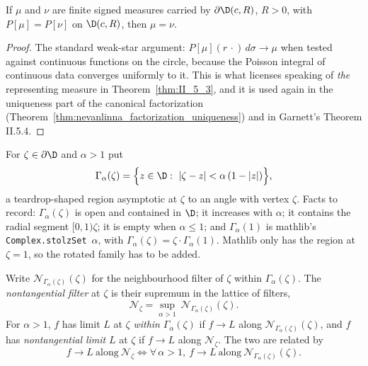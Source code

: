 \begin{theorem}
  \label{thm:poisson_measure_unique}
  \leanok
  \mainline
  If $\mu$ and $\nu$ are finite signed measures carried by $\partial\D(c,R)$,
  $R>0$, with $P[\mu]=P[\nu]$ on $\D(c,R)$, then $\mu=\nu$.
  \begin{proof}
    \notready
    The standard weak-star argument: $P[\mu](r\,\cdot)\,d\sigma\to\mu$ when
    tested against continuous functions on the circle, because the Poisson
    integral of continuous data converges uniformly to it. This is what
    licenses speaking of \emph{the} representing measure in
    Theorem~\ref{thm:II_5_3}, and it is used again in the uniqueness part of
    the canonical factorization
    (Theorem~\ref{thm:nevanlinna_factorization_uniqueness}) and in Garnett's
    Theorem II.5.4.
  \end{proof}
\end{theorem}

\begin{definition}
  \label{def:nt_region}
  \leanok
  \mainline
  For $\zeta\in\partial\D$ and $\alpha>1$ put
  \[
    \Gamma_\alpha(\zeta)
      =\Bigl\{z\in\D:\ |\zeta-z|<\alpha\,(1-|z|)\Bigr\},
  \]
  a teardrop-shaped region asymptotic at $\zeta$ to an angle with vertex
  $\zeta$. Facts to record: $\Gamma_\alpha(\zeta)$ is open and contained in
  $\D$; it increases with $\alpha$; it contains the radial segment
  $[0,1)\zeta$; it is empty when $\alpha\le 1$; and
  $\Gamma_\alpha(1)$ is mathlib's \texttt{Complex.stolzSet}~$\alpha$, with
  $\Gamma_\alpha(\zeta)=\zeta\cdot\Gamma_\alpha(1)$. Mathlib only has the
  region at $\zeta=1$, so the rotated family has to be added.
\end{definition}

\begin{definition}
  \label{def:nt_limit}
  \leanok
  \mainline
  Write $\mathcal{N}_{\Gamma_\alpha(\zeta)}(\zeta)$ for the neighbourhood filter
  of $\zeta$ within $\Gamma_\alpha(\zeta)$. The \emph{nontangential filter} at
  $\zeta$ is their supremum in the lattice of filters,
  \[
    \mathcal{N}_\zeta=\sup_{\alpha>1}\ \mathcal{N}_{\Gamma_\alpha(\zeta)}(\zeta).
  \]
  For $\alpha>1$, $f$ has limit $L$ at $\zeta$ \emph{within} $\Gamma_\alpha(\zeta)$
  if $f\to L$ along $\mathcal{N}_{\Gamma_\alpha(\zeta)}(\zeta)$, and $f$ has
  \emph{nontangential limit} $L$ at $\zeta$ if $f\to L$ along
  $\mathcal{N}_\zeta$. The two are related by
  \[
    f\to L \ \text{along}\ \mathcal{N}_\zeta
    \iff
    \forall\,\alpha>1,\ f\to L \ \text{along}\ \mathcal{N}_{\Gamma_\alpha(\zeta)}(\zeta).
  \]
\end{definition}

